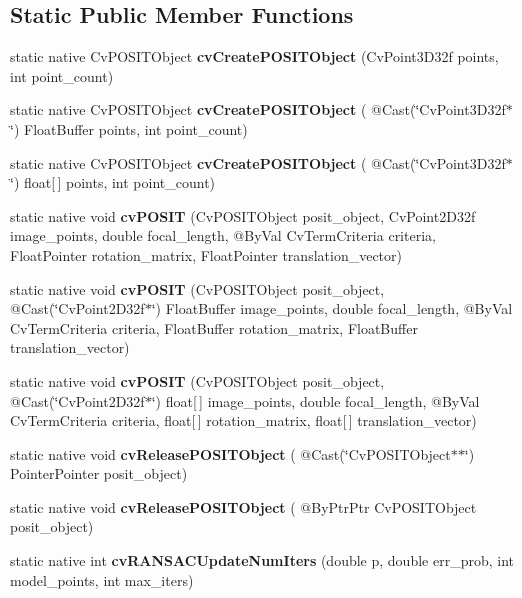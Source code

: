 \subsection*{Static Public Member Functions}
\begin{DoxyCompactItemize}
\item 
static native Cv\+P\+O\+S\+I\+T\+Object {\bfseries cv\+Create\+P\+O\+S\+I\+T\+Object} (Cv\+Point3\+D32f points, int point\+\_\+count)
\item 
static native Cv\+P\+O\+S\+I\+T\+Object {\bfseries cv\+Create\+P\+O\+S\+I\+T\+Object} ( @Cast(\char`\"{}Cv\+Point3\+D32f$\ast$\char`\"{}) Float\+Buffer points, int point\+\_\+count)
\item 
static native Cv\+P\+O\+S\+I\+T\+Object {\bfseries cv\+Create\+P\+O\+S\+I\+T\+Object} ( @Cast(\char`\"{}Cv\+Point3\+D32f$\ast$\char`\"{}) float\mbox{[}$\,$\mbox{]} points, int point\+\_\+count)
\item 
static native void {\bfseries cv\+P\+O\+S\+IT} (Cv\+P\+O\+S\+I\+T\+Object posit\+\_\+object, Cv\+Point2\+D32f image\+\_\+points, double focal\+\_\+length, @By\+Val Cv\+Term\+Criteria criteria, Float\+Pointer rotation\+\_\+matrix, Float\+Pointer translation\+\_\+vector)
\item 
static native void {\bfseries cv\+P\+O\+S\+IT} (Cv\+P\+O\+S\+I\+T\+Object posit\+\_\+object, @Cast(\char`\"{}Cv\+Point2\+D32f$\ast$\char`\"{}) Float\+Buffer image\+\_\+points, double focal\+\_\+length, @By\+Val Cv\+Term\+Criteria criteria, Float\+Buffer rotation\+\_\+matrix, Float\+Buffer translation\+\_\+vector)
\item 
static native void {\bfseries cv\+P\+O\+S\+IT} (Cv\+P\+O\+S\+I\+T\+Object posit\+\_\+object, @Cast(\char`\"{}Cv\+Point2\+D32f$\ast$\char`\"{}) float\mbox{[}$\,$\mbox{]} image\+\_\+points, double focal\+\_\+length, @By\+Val Cv\+Term\+Criteria criteria, float\mbox{[}$\,$\mbox{]} rotation\+\_\+matrix, float\mbox{[}$\,$\mbox{]} translation\+\_\+vector)
\item 
static native void {\bfseries cv\+Release\+P\+O\+S\+I\+T\+Object} ( @Cast(\char`\"{}Cv\+P\+O\+S\+I\+T\+Object$\ast$$\ast$\char`\"{}) Pointer\+Pointer posit\+\_\+object)
\item 
static native void {\bfseries cv\+Release\+P\+O\+S\+I\+T\+Object} ( @By\+Ptr\+Ptr Cv\+P\+O\+S\+I\+T\+Object posit\+\_\+object)
\item 
static native int {\bfseries cv\+R\+A\+N\+S\+A\+C\+Update\+Num\+Iters} (double p, double err\+\_\+prob, int model\+\_\+points, int max\+\_\+iters)
\item 
$$
\end{DoxyCompactItemize}
